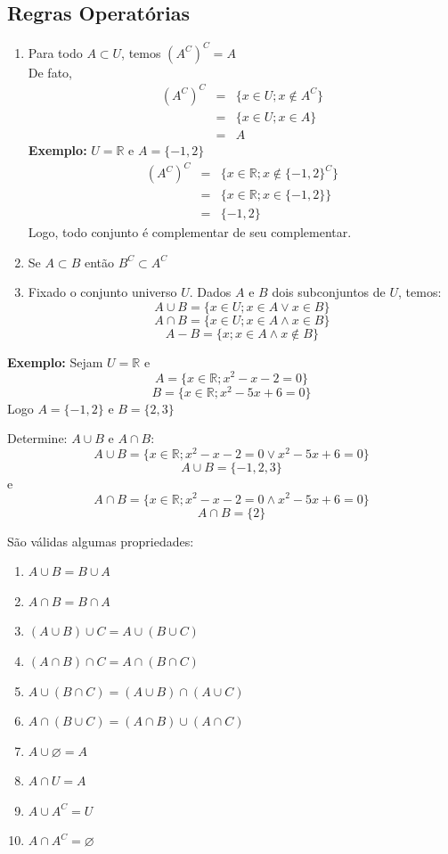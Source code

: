 \documentclass[oneside,a4paper,12pt]{article}
\begin{document}
\subsection{Regras Operatórias}
\begin{enumerate}
	\item Para todo $A \subset U$, temos $(A^{C})^{C} = A$ \\
	De fato,
	\begin{eqnarray*}
	(A^{C})^{C}	& = &	\{ x \in U; x \notin A^{C}\} \\
				& = & 	\{ x \in U; x \in A \} \\
				& = & A
	\end{eqnarray*}
	{\bf Exemplo: } $U = \mathbb{R}$ e $A = \{ -1,2\}$ \\
	\begin{eqnarray*}
		(A^{C})^{C}	& = &	\{ x \in \mathbb{R}; x \notin \{ -1,2\}^{C}\} \\
		& = & 	\{ x \in \mathbb{R}; x \in \{ -1,2\} \} \\
		& = & \{ -1,2\}
	\end{eqnarray*}
	Logo, todo conjunto é complementar de seu complementar.
	
	
	\item Se $A \subset B$ então $B^{C} \subset A^{C}$
	\vspace{200pt}
	
	\item Fixado o conjunto universo $U$. Dados $A$ e $B$ dois subconjuntos de $U$, temos:
	$$A \cup B = \{ x \in U; x \in A \lor x \in B  \} $$
	$$A \cap B = \{ x \in U; x \in A \land x \in B \} $$
	$$A - B = \{ x; x \in A \land x \notin B \}$$
	
\end{enumerate}

{\bf Exemplo: } Sejam $U = \mathbb{R}$ e 
$$A = \{ x\in \mathbb{R}; x^2-x-2=0  \}$$
$$B = \{ x \in \mathbb{R}; x^2-5x+6=0 \}$$
Logo $A=\{-1,2\}$ e $B=\{2,3\}$

Determine: $A \cup B$ e $A \cap B$:
$$A \cup B = \{ x \in \mathbb{R}; x^2-x-2=0 \lor x^2-5x+6=0 \} $$
$$A \cup B = \{ -1,2,3 \}$$
e
$$A \cap B = \{ x \in \mathbb{R};  x^2-x-2=0 \land x^2-5x+6=0   \}$$
$$A \cap B = \{ 2 \}$$


São válidas algumas propriedades:
\begin{enumerate}
	\item $A \cup B = B \cup A$
	\item $A \cap B = B \cap A$
	\item $(A \cup B) \cup C = A \cup (B \cup C)$
	\item $(A \cap B) \cap C = A \cap (B \cap C)$
	\item $A \cup (B \cap C) = (A \cup B) \cap (A \cup C)$
	\item $A \cap (B \cup C) = (A \cap B) \cup (A \cap C)$
	\item $A \cup \varnothing = A$
	\item $A \cap U = A$
	\item $A \cup A^{C} = U$
	\item $A \cap A^{C} = \varnothing$
\end{enumerate}
\end{document}
